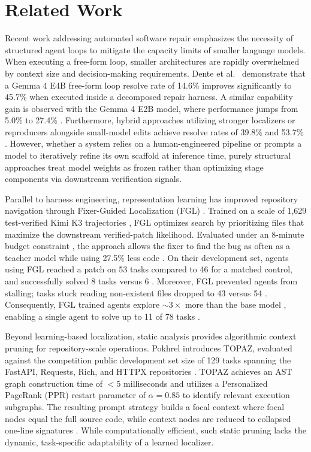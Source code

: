 \documentclass[11pt,a4paper]{article}
\begin{document}
\section{Related Work}

Recent work addressing automated software repair emphasizes the necessity of structured agent loops to mitigate the capacity limits of smaller language models. When executing a free-form loop, smaller architectures are rapidly overwhelmed by context size and decision-making requirements. Dente et al.\ \cite{LOOP} demonstrate that a Gemma 4 E4B free-form loop resolve rate of 14.6\% improves significantly to 45.7\% when executed inside a decomposed repair harness. A similar capability gain is observed with the Gemma 4 E2B model, where performance jumps from 5.0\% to 27.4\% \cite{LOOP}. Furthermore, hybrid approaches utilizing stronger localizers or reproducers alongside small-model edits achieve resolve rates of 39.8\% and 53.7\% \cite{LOOP}. However, whether a system relies on a human-engineered pipeline or prompts a model to iteratively refine its own scaffold at inference time, purely structural approaches treat model weights as frozen rather than optimizing stage components via downstream verification signals.

Parallel to harness engineering, representation learning has improved repository navigation through Fixer-Guided Localization (FGL) \cite{FGL}. Trained on a scale of 1,629 test-verified Kimi K3 trajectories \cite{FGL}, FGL optimizes search by prioritizing files that maximize the downstream verified-patch likelihood. Evaluated under an 8-minute budget constraint \cite{FGL}, the approach allows the fixer to find the bug as often as a teacher model while using 27.5\% less code \cite{FGL}. On their development set, agents using FGL reached a patch on 53 tasks compared to 46 for a matched control, and successfully solved 8 tasks versus 6 \cite{FGL}. Moreover, FGL prevented agents from stalling; tasks stuck reading non-existent files dropped to 43 versus 54 \cite{FGL}. Consequently, FGL trained agents explore ${\sim}3\times$ more than the base model \cite{FGL}, enabling a single agent to solve up to 11 of 78 tasks \cite{FGL}.

Beyond learning-based localization, static analysis provides algorithmic context pruning for repository-scale operations. Pokhrel \cite{TOPAZ} introduces TOPAZ, evaluated against the competition public development set size of 129 tasks \cite{KAGGLE} spanning the FastAPI, Requests, Rich, and HTTPX repositories \cite{KAGGLE}. TOPAZ achieves an AST graph construction time of $< 5$ milliseconds \cite{TOPAZ} and utilizes a Personalized PageRank (PPR) restart parameter of $\alpha = 0.85$ \cite{TOPAZ} to identify relevant execution subgraphs. The resulting prompt strategy builds a focal context where focal nodes equal the full source code, while context nodes are reduced to collapsed one-line signatures \cite{TOPAZ}. While computationally efficient, such static pruning lacks the dynamic, task-specific adaptability of a learned localizer.
\end{document}

